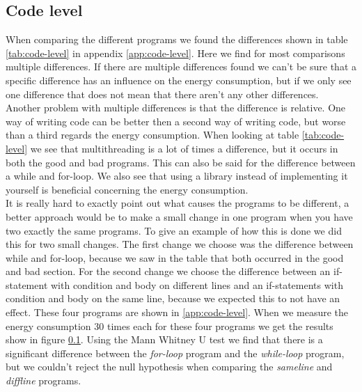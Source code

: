 \subsection{Code level}
When comparing the different programs we found the differences shown in table \ref{tab:code-level} in appendix \ref{app:code-level}. Here we find for most comparisons multiple differences. If there are multiple differences found we can't be sure that a specific difference has an influence on the energy consumption, but if we only see one difference that does not mean that there aren't any other differences. Another problem with multiple differences is that the difference is relative. One way of writing code can be better then a second way of writing code, but worse than a third regards the energy consumption. When looking at table \ref{tab:code-level} we see that multithreading is a lot of times a difference, but it occurs in both the good and bad programs. This can also be said for the difference between a while and for-loop. We also see that using a library instead of implementing it yourself is beneficial concerning the energy consumption.\\

It is really hard to exactly point out what causes the programs to be different, a better approach would be to make a small change in one program when you have two exactly the same programs. To give an example of how this is done we did this for two small changes. The first change we choose was the difference between while and for-loop, because we saw in the table that both occurred in the good and bad section. For the second change we choose the difference between an if-statement with condition and body on different lines and an if-statements with condition and body on the same line, because we expected this to not have an effect. These four programs are shown in \ref{app:code-level}. When we measure the energy consumption 30 times each for these four programs we get the results show in figure \ref{}. Using the Mann Whitney U test we find that there is a significant difference between the \textit{for-loop} program and the \textit{while-loop} program, but we couldn't reject the null hypothesis when comparing the \textit{sameline} and \textit{diffline} programs.

